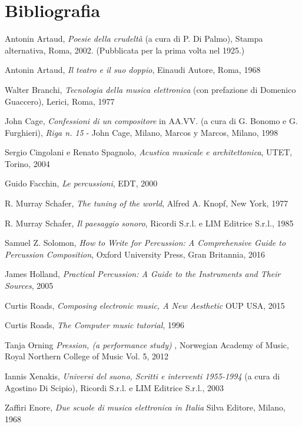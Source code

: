 
\chapter{Bibliografia}
\label{chp:Bibliografia}

Antonin Artaud, \textit{Poesie della crudeltà} (a cura di P. Di Palmo), Stampa alternativa, Roma, 2002. (Pubblicata per la prima volta nel 1925.)

Antonin Artaud, \textit{Il teatro e il suo doppio}, Einaudi Autore, Roma, 1968

Walter Branchi, \textit{Tecnologia della musica elettronica} (con prefazione di Domenico Guaccero), Lerici, Roma, 1977

John Cage, \textit{Confessioni di un compositore} in AA.VV. (a cura di G. Bonomo e G. Furghieri), \textit{Riga n. 15} - John Cage, Milano, Marcos y Marcos, Milano, 1998

Sergio Cingolani e Renato Spagnolo, \textit{Acustica musicale e architettonica}, UTET, Torino, 2004

Guido Facchin,  \textit{Le percussioni}, EDT, 2000

R. Murray Schafer, \textit{The tuning of the world}, Alfred A. Knopf, New York, 1977

R. Murray Schafer, \textit{Il paesaggio sonoro}, Ricordi S.r.l. e LIM Editrice S.r.l., 1985

Samuel Z. Solomon, \textit{How to Write for Percussion: A Comprehensive Guide to Percussion Composition}, Oxford University Press, Gran Britannia, 2016

James Holland, \textit{Practical Percussion: A Guide to the Instruments and Their Sources}, 2005

Curtis Roads, \textit{Composing electronic music, A New Aesthetic} OUP USA, 2015

Curtis Roads, \textit{The Computer music tutorial}, 1996

Tanja Orning \textit{Pression, (a performance study) }, Norwegian Academy of Music, Royal Northern College of Music Vol. 5, 2012

Iannis Xenakis, \textit{Universi del suono, Scritti e interventi 1955-1994} (a cura di Agostino Di Scipio), Ricordi S.r.l. e LIM Editrice S.r.l., 2003

Zaffiri Enore, \textit{Due scuole di musica elettronica in Italia} Silva Editore, Milano, 1968 